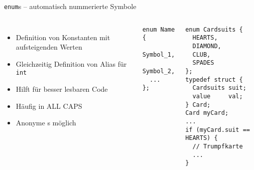 \begin{frame}[fragile]{\texttt{enum}s -- automatisch nummerierte Symbole}
%
\begin{columns}[T]
\vspace{-5pt}
\begin{itemize}
\item Definition von Konstanten mit aufsteigenden Werten
\item Gleichzeitig Definition von Alias für \texttt{int}
\item Hilft für besser lesbaren Code
\item Häufig in ALL CAPS
\item Anonyme s möglich
\end{itemize}
%
\begin{codebox}[Syntax]
\begin{verbatim}
enum Name {
  Symbol_1,
  Symbol_2,
  ...
};
\end{verbatim}
\end{codebox}
%
\vspace{-7pt}
\begin{codebox}[Beispiel]
\begin{verbatim}
enum Cardsuits {
  HEARTS,
  DIAMOND,
  CLUB,
  SPADES
};
typedef struct {
  Cardsuits suit;
  value     val;
} Card;
Card myCard;
...
if (myCard.suit == HEARTS) {
  // Trumpfkarte
  ...
}
\end{verbatim}
\end{codebox}
\end{columns}
%
\end{frame}


